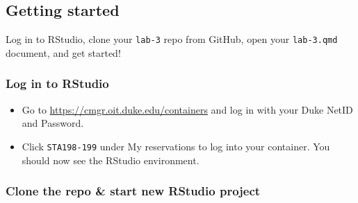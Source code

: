 \documentclass[
  letterpaper,
  DIV=11,
  numbers=noendperiod]{scrartcl}
\providecommand{\tightlist}{%
  \setlength{\itemsep}{0pt}\setlength{\parskip}{0pt}}
\begin{document}
\subsection{Getting started}\label{getting-started}

Log in to RStudio, clone your \texttt{lab-3} repo from GitHub, open your
\texttt{lab-3.qmd} document, and get started!

\begin{tcolorbox}[enhanced jigsaw, toptitle=1mm, bottomrule=.15mm, colbacktitle=quarto-callout-tip-color!10!white, colframe=quarto-callout-tip-color-frame, leftrule=.75mm, breakable, toprule=.15mm, colback=white, arc=.35mm, coltitle=black, left=2mm, opacitybacktitle=0.6, bottomtitle=1mm, opacityback=0, title=\textcolor{quarto-callout-tip-color}{\faLightbulb}\hspace{0.5em}{Click here if you prefer to see step-by-step instructions}, titlerule=0mm, rightrule=.15mm]

\subsubsection{Log in to RStudio}\label{log-in-to-rstudio}

\begin{itemize}
\tightlist
\item
  Go to \url{https://cmgr.oit.duke.edu/containers} and log in with your
  Duke NetID and Password.
\item
  Click \texttt{STA198-199} under My reservations to log into your
  container. You should now see the RStudio environment.
\end{itemize}

\subsubsection{Clone the repo \& start new RStudio
project}\label{clone-the-repo-start-new-rstudio-project}


\end{tcolorbox}
\end{document}
